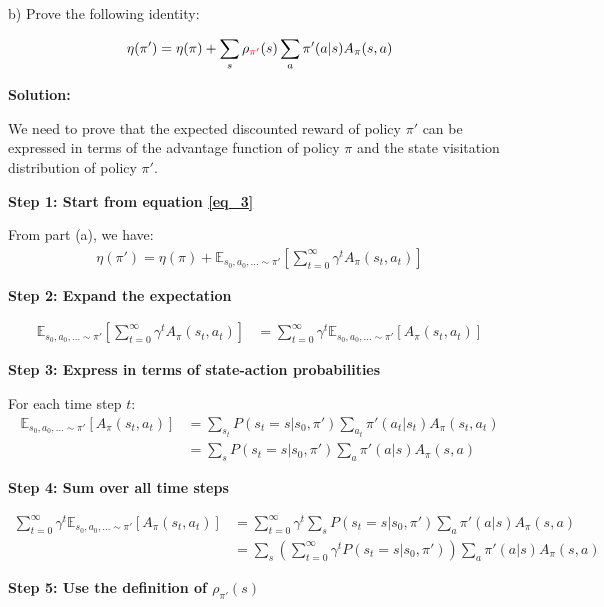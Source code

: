 b) Prove the following identity:

\begin{align}\label{true_objective}
    \eta(\pi') = \eta(\pi) + \sum_{s}\rho_{\textcolor{red}{\pi'}}(s)\sum_{a}\pi'(a|s)A_{\pi}(s, a)
\end{align}

\textbf{Solution:}

We need to prove that the expected discounted reward of policy $\pi'$ can be expressed in terms of the advantage function of policy $\pi$ and the state visitation distribution of policy $\pi'$.

\textbf{Step 1: Start from equation \ref{eq_3}}

From part (a), we have:
\begin{align}
\eta(\pi') = \eta(\pi) + \mathbb{E}_{s_{0}, a_{0}, \ldots \sim \pi'} \left[ \sum_{t = 0}^{\infty} \gamma^t A_\pi(s_t, a_t) \right]
\end{align}

\textbf{Step 2: Expand the expectation}

\begin{align}
\mathbb{E}_{s_{0}, a_{0}, \ldots \sim \pi'} \left[ \sum_{t = 0}^{\infty} \gamma^t A_\pi(s_t, a_t) \right] &= \sum_{t = 0}^{\infty} \gamma^t \mathbb{E}_{s_{0}, a_{0}, \ldots \sim \pi'} [A_\pi(s_t, a_t)]
\end{align}

\textbf{Step 3: Express in terms of state-action probabilities}

For each time step $t$:
\begin{align}
\mathbb{E}_{s_{0}, a_{0}, \ldots \sim \pi'} [A_\pi(s_t, a_t)] &= \sum_{s_t} P(s_t = s | s_0, \pi') \sum_{a_t} \pi'(a_t | s_t) A_\pi(s_t, a_t) \\
&= \sum_{s} P(s_t = s | s_0, \pi') \sum_{a} \pi'(a | s) A_\pi(s, a)
\end{align}

\textbf{Step 4: Sum over all time steps}

\begin{align}
\sum_{t = 0}^{\infty} \gamma^t \mathbb{E}_{s_{0}, a_{0}, \ldots \sim \pi'} [A_\pi(s_t, a_t)] &= \sum_{t = 0}^{\infty} \gamma^t \sum_{s} P(s_t = s | s_0, \pi') \sum_{a} \pi'(a | s) A_\pi(s, a) \\
&= \sum_{s} \left( \sum_{t = 0}^{\infty} \gamma^t P(s_t = s | s_0, \pi') \right) \sum_{a} \pi'(a | s) A_\pi(s, a)
\end{align}

\textbf{Step 5: Use the definition of $\rho_{\pi'}(s)$}


